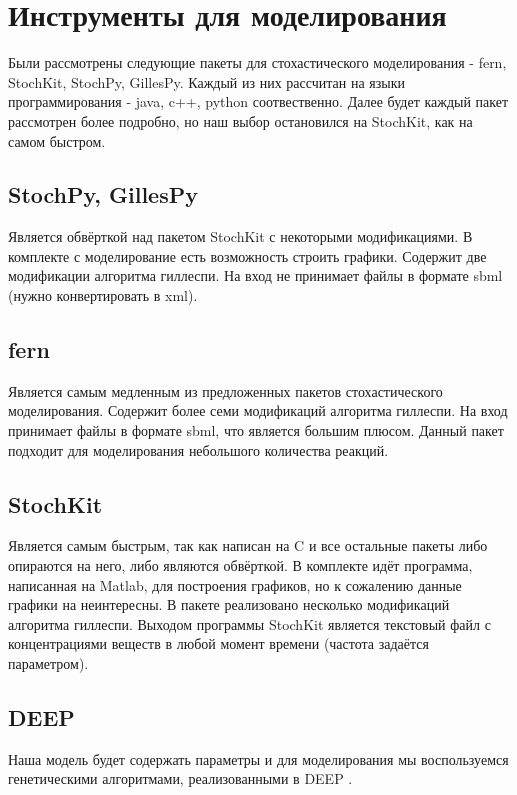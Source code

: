 \section{Инструменты для моделирования}
Были рассмотрены следующие пакеты для стохастического моделирования - fern\cite{fern}, StochKit\cite{stochkit}, StochPy\cite{stochpy},
GillesPy\cite{stochkit}.
Каждый из них рассчитан на языки программирования - java, c++, python соотвественно. Далее будет каждый пакет рассмотрен более подробно,
но наш выбор остановился на StochKit, как на самом быстром.
\subsection{StochPy, GillesPy}
Является обвёрткой над пакетом StochKit с некоторыми модификациями. В комплекте с моделирование есть возможность строить графики.
Содержит две модификации  алгоритма гиллеспи. На вход не принимает файлы в формате sbml (нужно конвертировать в xml).
\subsection{fern}
Является самым медленным из предложенных пакетов стохастического моделирования. Содержит более семи модификаций алгоритма гиллеспи. На вход
принимает файлы в формате sbml, что является большим плюсом. Данный пакет подходит для моделирования небольшого количества реакций.
\subsection{StochKit}
Является самым быстрым, так как написан на C и все остальные пакеты либо опираются на него, либо являются обвёрткой. В комплекте идёт
программа, написанная на Matlab, для построения графиков, но к сожалению данные графики на неинтересны. В пакете реализовано несколько
модификаций алгоритма гиллеспи. Выходом программы StochKit является текстовый файл с концентрациями веществ в любой момент времени (частота
задаётся параметром).
\subsection{DEEP}
Наша модель будет содержать параметры и для моделирования мы воспользуемся генетическими алгоритмами, реализованными в DEEP \cite{deep}.
